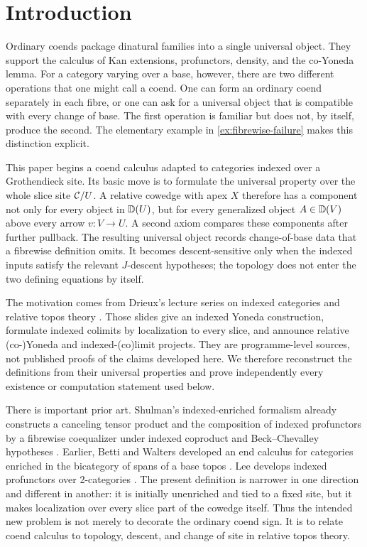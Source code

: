 \section{Introduction}
\label{sec:introduction}

Ordinary coends package dinatural families into a single universal object.
They support the calculus of Kan extensions, profunctors, density, and the
co-Yoneda lemma.  For a category varying over a base, however, there are two
different operations that one might call a coend.  One can form an ordinary
coend separately in each fibre, or one can ask for a universal object that is
compatible with every change of base.  The first operation is familiar but
does not, by itself, produce the second.  The elementary example in
\cref{ex:fibrewise-failure} makes this distinction explicit.

This paper begins a coend calculus adapted to categories indexed over a
Grothendieck site.  Its basic move is to formulate the universal property over
the whole slice site \(\mathcal{C}/U\).  A relative cowedge with apex \(X\) therefore
has a component not only for every object in \(\mathbb{D}(U)\), but for every
generalized object \(A\in\mathbb{D}(V)\) above every arrow \(v:V\to U\).  A second
axiom compares these components after further pullback.  The resulting
universal object records change-of-base data that a fibrewise definition
omits.  It becomes descent-sensitive only when the indexed inputs satisfy
the relevant \(J\)-descent hypotheses; the topology does not enter the two
defining equations by itself.

The motivation comes from Drieux's lecture series on indexed categories and
relative topos theory \cite{Drieux2025LIX,Drieux2025Wuhan,Drieux2026LHC,
Drieux2026TACL}.  Those slides give an indexed Yoneda construction, formulate
indexed colimits by localization to every slice, and announce relative
(co-)Yoneda and indexed-(co)limit projects.  They are programme-level sources,
not published proofs of the claims developed here.  We therefore reconstruct
the definitions from their universal properties and prove independently every
existence or computation statement used below.

There is important prior art.  Shulman's indexed-enriched formalism already
constructs a canceling tensor product and the composition of indexed
profunctors by a fibrewise coequalizer under indexed coproduct and
Beck--Chevalley hypotheses \cite[Definition~2.4, Definition~2.10, and
Lemma~3.25]{Shulman2013}.  Earlier, Betti and Walters developed an end calculus
for categories enriched in the bicategory of spans of a base topos
\cite{BettiWalters1989}.  Lee develops
indexed profunctors over 2-categories \cite{Lee2023}.  The present definition
is narrower in one direction and different in another: it is initially
unenriched and tied to a fixed site, but it makes localization over every
slice part of the cowedge itself.  Thus the intended new problem is not
merely to decorate the ordinary coend sign.  It is to relate coend calculus
to topology, descent, and change of site in relative topos theory.

